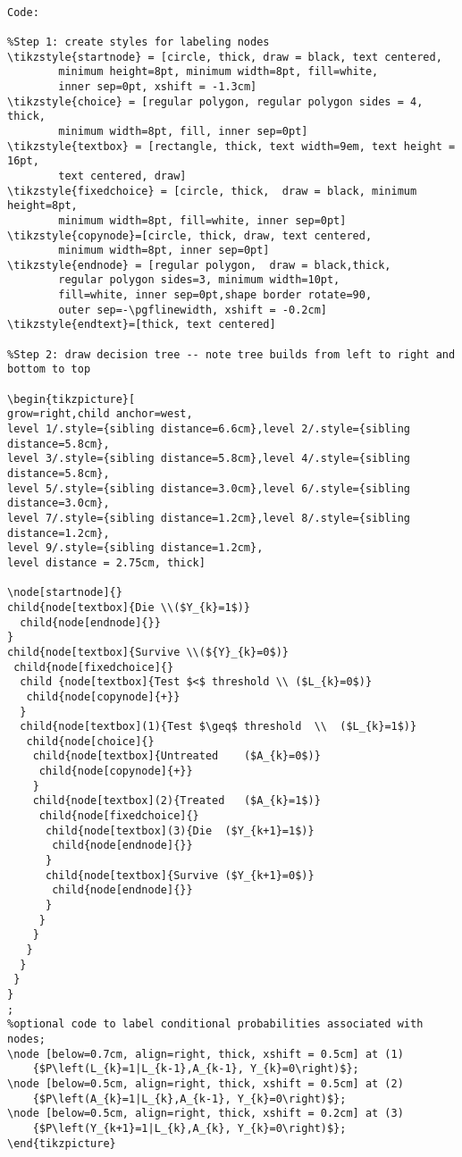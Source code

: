\documentclass[a4paper]{report}
\begin{document}
\begin{framed}
\begin{Verbatim}

Code:

%Step 1: create styles for labeling nodes
\tikzstyle{startnode} = [circle, thick, draw = black, text centered, 
		minimum height=8pt, minimum width=8pt, fill=white, 
		inner sep=0pt, xshift = -1.3cm]
\tikzstyle{choice} = [regular polygon, regular polygon sides = 4, thick,  
		minimum width=8pt, fill, inner sep=0pt]
\tikzstyle{textbox} = [rectangle, thick, text width=9em, text height = 16pt, 
		text centered, draw]
\tikzstyle{fixedchoice} = [circle, thick,  draw = black, minimum height=8pt, 
		minimum width=8pt, fill=white, inner sep=0pt]
\tikzstyle{copynode}=[circle, thick, draw, text centered, 
		minimum width=8pt, inner sep=0pt]
\tikzstyle{endnode} = [regular polygon,  draw = black,thick, 
		regular polygon sides=3, minimum width=10pt, 
		fill=white, inner sep=0pt,shape border rotate=90,
		outer sep=-\pgflinewidth, xshift = -0.2cm]
\tikzstyle{endtext}=[thick, text centered]

%Step 2: draw decision tree -- note tree builds from left to right and bottom to top

\begin{tikzpicture}[
grow=right,child anchor=west,
level 1/.style={sibling distance=6.6cm},level 2/.style={sibling distance=5.8cm},
level 3/.style={sibling distance=5.8cm},level 4/.style={sibling distance=5.8cm},
level 5/.style={sibling distance=3.0cm},level 6/.style={sibling distance=3.0cm},
level 7/.style={sibling distance=1.2cm},level 8/.style={sibling distance=1.2cm},
level 9/.style={sibling distance=1.2cm},
level distance = 2.75cm, thick]

\node[startnode]{}
child{node[textbox]{Die \\($Y_{k}=1$)}
  child{node[endnode]{}}
}
child{node[textbox]{Survive \\(${Y}_{k}=0$)}
 child{node[fixedchoice]{} 
  child {node[textbox]{Test $<$ threshold \\ ($L_{k}=0$)}
   child{node[copynode]{+}}	
  }
  child{node[textbox](1){Test $\geq$ threshold  \\  ($L_{k}=1$)}
   child{node[choice]{}
    child{node[textbox]{Untreated    ($A_{k}=0$)} 
     child{node[copynode]{+}}
    }
    child{node[textbox](2){Treated   ($A_{k}=1$)} 
     child{node[fixedchoice]{}		
      child{node[textbox](3){Die  ($Y_{k+1}=1$)} 
       child{node[endnode]{}}
      }
      child{node[textbox]{Survive ($Y_{k+1}=0$)} 
       child{node[endnode]{}}
      }	
     }
    }
   }						
  }
 }
}
;	
%optional code to label conditional probabilities associated with nodes;			
\node [below=0.7cm, align=right, thick, xshift = 0.5cm] at (1) 
	{$P\left(L_{k}=1|L_{k-1},A_{k-1}, Y_{k}=0\right)$};
\node [below=0.5cm, align=right, thick, xshift = 0.5cm] at (2) 
	{$P\left(A_{k}=1|L_{k},A_{k-1}, Y_{k}=0\right)$};
\node [below=0.5cm, align=right, thick, xshift = 0.2cm] at (3) 
	{$P\left(Y_{k+1}=1|L_{k},A_{k}, Y_{k}=0\right)$};
\end{tikzpicture}

\end{Verbatim}
\end{framed}
\end{document}
